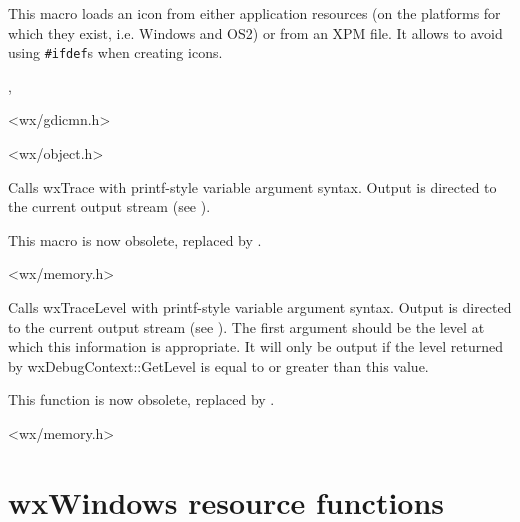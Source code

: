 

\label{wxiconmacro}


This macro loads an icon from either application resources (on the platforms
for which they exist, i.e. Windows and OS2) or from an XPM file. It allows to
avoid using {\tt \#ifdef}s when creating icons.


, 


<wx/gdicmn.h>

\label{trace}


<wx/object.h>


Calls wxTrace with printf-style variable argument syntax. Output
is directed to the current output stream (see ).

This macro is now obsolete, replaced by .


<wx/memory.h>

\label{tracelevel}


Calls wxTraceLevel with printf-style variable argument syntax. Output
is directed to the current output stream (see ).
The first argument should be the level at which this information is appropriate.
It will only be output if the level returned by wxDebugContext::GetLevel is equal to or greater than
this value.

This function is now obsolete, replaced by .


<wx/memory.h>

\section{wxWindows resource functions}\label{resourcefuncs}

